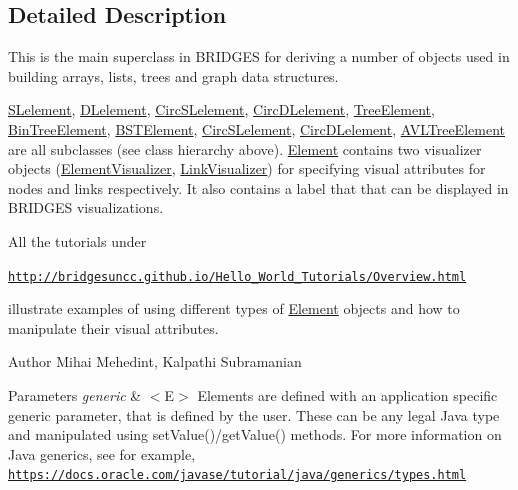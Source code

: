 \subsection{Detailed Description}
This is the main superclass in B\+R\+I\+D\+G\+E\+S for deriving a number of objects used in building arrays, lists, trees and graph data structures. 

\hyperlink{namespace_s_lelement}{S\+Lelement}, \hyperlink{namespace_d_lelement}{D\+Lelement}, \hyperlink{namespace_circ_s_lelement}{Circ\+S\+Lelement}, \hyperlink{namespace_circ_d_lelement}{Circ\+D\+Lelement}, \hyperlink{namespace_tree_element}{Tree\+Element}, \hyperlink{namespace_bin_tree_element}{Bin\+Tree\+Element}, \hyperlink{namespace_b_s_t_element}{B\+S\+T\+Element}, \hyperlink{namespace_circ_s_lelement}{Circ\+S\+Lelement}, \hyperlink{namespace_circ_d_lelement}{Circ\+D\+Lelement}, \hyperlink{namespace_a_v_l_tree_element}{A\+V\+L\+Tree\+Element} are all subclasses (see class hierarchy above). \hyperlink{class_element_1_1_element}{Element} contains two visualizer objects (\hyperlink{namespace_element_visualizer}{Element\+Visualizer}, \hyperlink{namespace_link_visualizer}{Link\+Visualizer}) for specifying visual attributes for nodes and links respectively. It also contains a label that that can be displayed in B\+R\+I\+D\+G\+E\+S visualizations.

All the tutorials under

\href{http://bridgesuncc.github.io/Hello_World_Tutorials/Overview.html}{\tt http\+://bridgesuncc.\+github.\+io/\+Hello\+\_\+\+World\+\_\+\+Tutorials/\+Overview.\+html}

illustrate examples of using different types of \hyperlink{class_element_1_1_element}{Element} objects and how to manipulate their visual attributes.

\begin{DoxyAuthor}{Author}
Mihai Mehedint, Kalpathi Subramanian
\end{DoxyAuthor}

\begin{DoxyParams}{Parameters}
{\em generic} & $<$\+E$>$ Elements are defined with an application specific generic parameter, that is defined by the user. These can be any legal Java type and manipulated using set\+Value()/get\+Value() methods. For more information on Java generics, see for example, \href{https://docs.oracle.com/javase/tutorial/java/generics/types.html}{\tt https\+://docs.\+oracle.\+com/javase/tutorial/java/generics/types.\+html} \\
\hline
\end{DoxyParams}


